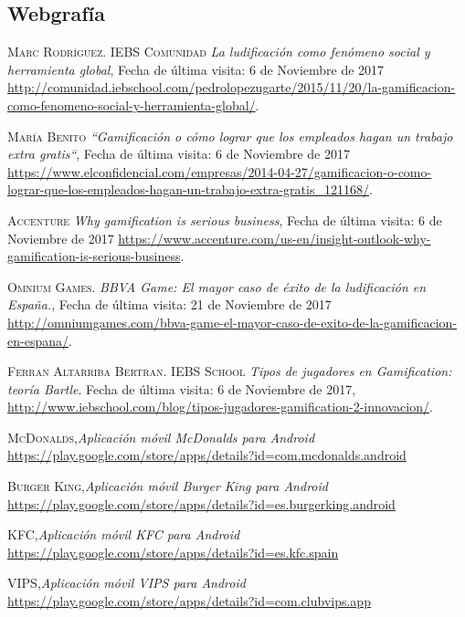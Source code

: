 \documentclass[twoside]{report}
\begin{document}
\begin{thebibliography}{a} 
\section{Webgrafía}

 \textsc{Marc Rodríguez. IEBS Comunidad} \textit{La ludificación como fenómeno social y herramienta global}, Fecha de última visita: 6 de Noviembre de 2017 \url{http://comunidad.iebschool.com/pedrolopezugarte/2015/11/20/la-gamificacion-como-fenomeno-social-y-herramienta-global/}.  

 \textsc{María Benito} \textit{“Gamificación o cómo lograr que los empleados hagan un trabajo extra gratis“}, Fecha de última visita: 6 de Noviembre de 2017 \url{https://www.elconfidencial.com/empresas/2014-04-27/gamificacion-o-como-lograr-que-los-empleados-hagan-un-trabajo-extra-gratis_121168/}. 

 \textsc{Accenture} \textit{Why gamification is serious business}, Fecha de última visita: 6 de Noviembre de 2017 \url{https://www.accenture.com/us-en/insight-outlook-why-gamification-is-serious-business}.  

 \textsc{Omnium Games.} \textit{BBVA Game: El mayor caso de éxito de la ludificación en España.}, Fecha de última visita: 21 de Noviembre de 2017 \url{http://omniumgames.com/bbva-game-el-mayor-caso-de-exito-de-la-gamificacion-en-espana/}.  

 \textsc{Ferran Altarriba Bertran. IEBS School} \textit{Tipos de jugadores en Gamification: teoría Bartle}. Fecha de última visita: 6 de Noviembre de 2017, \url{http://www.iebschool.com/blog/tipos-jugadores-gamification-2-innovacion/}.  

 \textsc{McDonalds},\textit{Aplicación móvil McDonalds para Android} \url{https://play.google.com/store/apps/details?id=com.mcdonalds.android}

 \textsc{Burger King},\textit{Aplicación móvil Burger King para Android} \url{https://play.google.com/store/apps/details?id=es.burgerking.android}

 \textsc{KFC},\textit{Aplicación móvil KFC para Android} \url{https://play.google.com/store/apps/details?id=es.kfc.spain}

 \textsc{VIPS},\textit{Aplicación móvil VIPS para Android} \url{https://play.google.com/store/apps/details?id=com.clubvips.app}


\end{thebibliography}
\end{document}
